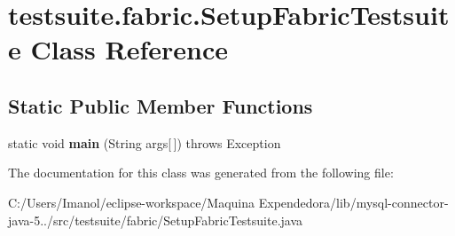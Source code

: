 \hypertarget{classtestsuite_1_1fabric_1_1_setup_fabric_testsuite}{}\section{testsuite.\+fabric.\+Setup\+Fabric\+Testsuite Class Reference}
\label{classtestsuite_1_1fabric_1_1_setup_fabric_testsuite}
\subsection*{Static Public Member Functions}
\begin{DoxyCompactItemize}
\item 
\mbox{\label{classtestsuite_1_1fabric_1_1_setup_fabric_testsuite_a19a453309b9a9e20b87e73a66f0e703d}} 
static void {\bfseries main} (String args\mbox{[}$\,$\mbox{]})  throws Exception 
\end{DoxyCompactItemize}


The documentation for this class was generated from the following file\+:\begin{DoxyCompactItemize}
\item 
C\+:/\+Users/\+Imanol/eclipse-\/workspace/\+Maquina Expendedora/lib/mysql-\/connector-\/java-\/5../src/testsuite/fabric/Setup\+Fabric\+Testsuite.\+java\end{DoxyCompactItemize}
